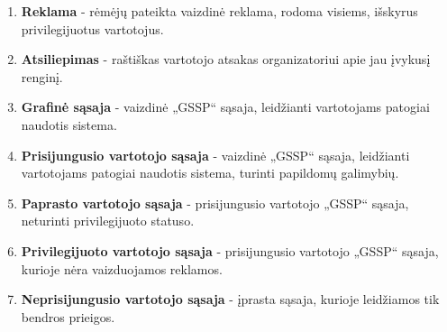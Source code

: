 \documentclass{VUMIFPSkursinis}
\begin{document}
\begin{enumerate}[label=\textbf{E\arabic*.}]
				\item \textbf{Reklama} - rėmėjų pateikta vaizdinė reklama, rodoma visiems, išskyrus privilegijuotus vartotojus.
				\item \textbf{Atsiliepimas} - raštiškas vartotojo atsakas organizatoriui apie jau įvykusį renginį.
				\item \textbf{Grafinė sąsaja} - vaizdinė „GSSP“ sąsaja, leidžianti vartotojams patogiai naudotis sistema.
				\item \textbf{Prisijungusio vartotojo sąsaja} - vaizdinė „GSSP“ sąsaja, leidžianti vartotojams patogiai naudotis sistema, turinti papildomų galimybių.
				\item \textbf{Paprasto vartotojo sąsaja} - prisijungusio vartotojo „GSSP“ sąsaja, neturinti privilegijuoto statuso.
				\item \textbf{Privilegijuoto vartotojo sąsaja} - prisijungusio vartotojo „GSSP“ sąsaja, kurioje nėra vaizduojamos reklamos.
				\item \textbf{Neprisijungusio vartotojo sąsaja} - įprasta sąsaja, kurioje leidžiamos tik bendros prieigos.
				
            \end{enumerate}
\end{document}
